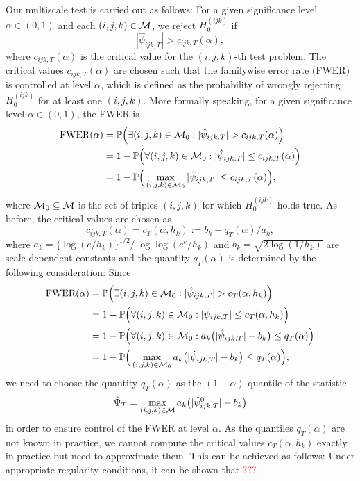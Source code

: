 \documentclass[a4paper,11pt]{article}
\numberwithin{equation}{section}
\begin{document}
Our multiscale test is carried out as follows: For a given significance level $\alpha \in (0,1)$ and each $(i,j,k) \in \mathcal{M}$, we reject $H_0^{(ijk)}$ if 
\[ |\hat{\psi}_{ijk,T}| > c_{ijk,T}(\alpha), \]
where $c_{ijk,T}(\alpha)$ is the critical value for the $(i,j,k)$-th test problem. The critical values $c_{ijk,T}(\alpha)$ are chosen such that the familywise error rate (FWER) is controlled at level $\alpha$, which is defined as the probability of wrongly rejecting $H_0^{(ijk)}$ for at least one $(i,j,k)$. More formally speaking, for a given significance level $\alpha \in (0,1)$, the FWER is 
\begin{align*}
\text{FWER}(\alpha) 
 & = \mathbb{P} \Big( \exists (i,j,k) \in \mathcal{M}_0: |\hat{\psi}_{ijk,T}| > c_{ijk,T}(\alpha) \Big) \\
 & =  1 - \mathbb{P} \Big( \forall (i,j,k) \in \mathcal{M}_0: |\hat{\psi}_{ijk,T}| \le c_{ijk,T}(\alpha) \Big) \\
 & = 1 - \mathbb{P}\Big( \max_{(i,j,k) \in \mathcal{M}_0} |\hat{\psi}_{ijk,T}| \le c_{ijk,T}(\alpha) \Big), 
\end{align*}
where $\mathcal{M}_0 \subseteq \mathcal{M}$ is the set of triples $(i,j,k)$ for which $H_0^{(ijk)}$ holds true. As before, the critical values are chosen as
\begin{equation*}
c_{ijk,T}(\alpha) = c_T(\alpha,h_k) := b_k + q_T(\alpha)/a_k, 
\end{equation*}
where $a_k = \{\log(e/h_k)\}^{1/2} / \log \log(e^e / h_k)$ and $b_k = \sqrt{2 \log(1/h_k)}$ are scale-dependent constants and the quantity $q_T(\alpha)$ is determined by the following consideration: Since 
\begin{align*}
\text{FWER}(\alpha)
  & = \mathbb{P} \Big( \exists (i,j,k) \in \mathcal{M}_0: |\hat{\psi}_{ijk,T}| > c_T(\alpha,h_k) \Big)  \\
 & =  1 - \mathbb{P} \Big( \forall (i,j,k) \in \mathcal{M}_0: |\hat{\psi}_{ijk,T}| \le c_T(\alpha,h_k) \Big) \\
 & =  1 - \mathbb{P} \Big( \forall (i,j,k) \in \mathcal{M}_0: a_k \big(|\hat{\psi}_{ijk,T}| - b_k\big) \le q_T(\alpha) \Big) \\
 & = 1 - \mathbb{P}\Big( \max_{(i,j,k) \in \mathcal{M}_0} a_k \big( |\hat{\psi}_{ijk,T}| - b_k \big) \le q_T(\alpha) \Big),
\end{align*}
we need to choose the quantity $q_T(\alpha)$ as the $(1-\alpha)$-quantile of the statistic 
\[ \hat{\Psi}_T = \max_{(i,j,k) \in \mathcal{M}} a_k \big( |\hat{\psi}_{ijk,T}^{0}| - b_k \big) \]
in order to ensure control of the FWER at level $\alpha$. As the quantiles $q_T(\alpha)$ are not known in practice, we cannot compute the critical values $c_T(\alpha,h_k)$ exactly in practice but need to approximate them. This can be achieved as follows: Under appropriate regularity conditions, it can be shown that \textcolor{red}{???}
\end{document}

